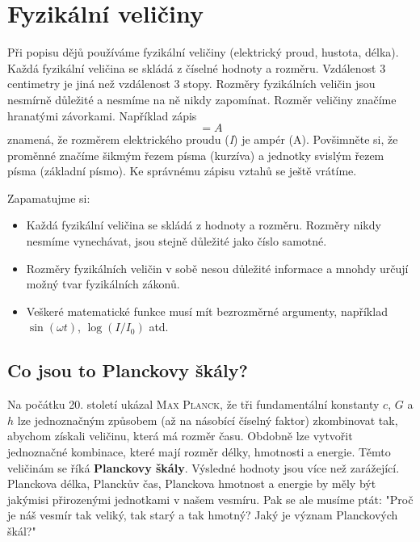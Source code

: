   \section{Fyzikální veličiny}\label{fyz:IchapIsecIX}
    Při popisu dějů používáme fyzikální veličiny (elektrický proud, hustota, délka). Každá fyzikální
    veličina se skládá z číselné hodnoty a rozměru. Vzdálenost \num{3} centimetry je jiná než
    vzdálenost \num{3} stopy. Rozměry fyzikálních veličin jsou nesmírně důležité a nesmíme na ně
    nikdy zapomínat. Rozměr veličiny značíme hranatými závorkami. Například zápis 
    \begin{equation*}
      [I] = \si{A}
    \end{equation*}
    znamená, že rozměrem elektrického proudu (\emph{I}) je ampér (A). Povšimněte si, že proměnné
    značíme šikmým řezem písma (kurzíva) a jednotky svislým řezem písma (základní písmo). Ke
    správnému zápisu vztahů se ještě vrátíme. 
    
    Zapamatujme si:
    \begin{itemize}[noitemsep]
      \item Každá fyzikální veličina se skládá z hodnoty a rozměru. Rozměry nikdy nesmíme
            vynechávat, jsou stejně důležité jako číslo samotné.
      \item Rozměry fyzikálních veličin v sobě nesou důležité informace a mnohdy určují možný tvar
            fyzikálních zákonů.
      \item Veškeré matematické funkce musí mít bezrozměrné argumenty, například \(\sin(ωt)\),
            \(\log(I/I_0)\) atd.
    \end{itemize}
 
    

    \subsection{Co jsou to Planckovy škály?}\label{fyz:IchapIsecIXssecI}
      Na počátku 20. století ukázal \textsc{Max Planck}, že tři fundamentální konstanty \(c\), \(G\)
      a \(h\) lze jednoznačným způsobem (až na násobící číselný faktor) zkombinovat tak, abychom
      získali veličinu, která má rozměr času. Obdobně lze vytvořit jednoznačné kombinace, které mají
      rozměr délky, hmotnosti a energie. Těmto veličinám se říká \textbf{Planckovy škály}. Výsledné
      hodnoty jsou více než zarážející. Planckova délka, Planckův čas, Planckova hmotnost a energie
      by měly být jakýmisi přirozenými jednotkami v našem vesmíru. Pak se ale musíme ptát: "Proč je
      náš vesmír tak veliký, tak starý a tak hmotný? Jaký je význam Planckových škál?"

